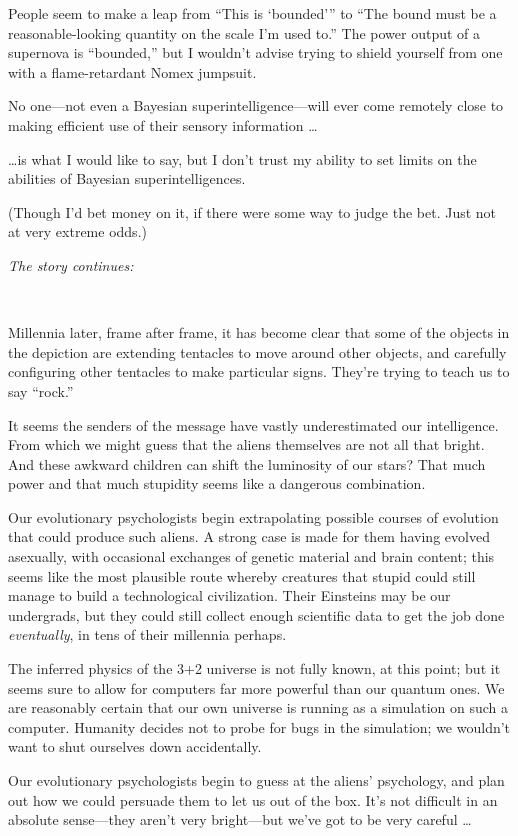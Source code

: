 {
 People seem to make a leap from ``This is
`bounded''' to
``The bound must be a reasonable-looking quantity on
the scale I'm used to.'' The power
output of a supernova is
``bounded,'' but I
wouldn't advise trying to shield yourself from one with
a flame-retardant Nomex jumpsuit.}

{
 No one---not even a Bayesian superintelligence---will ever come
remotely close to making efficient use of their sensory information
\ldots}

{
 \ldots is what I would like to say, but I don't
trust my ability to set limits on the abilities of Bayesian
superintelligences.}

{
 (Though I'd bet money on it, if there were some
way to judge the bet. Just not at very extreme odds.)}

{
 \textit{The story continues:}}

{
 ~}

{
 Millennia later, frame after frame, it has become clear that some
of the objects in the depiction are extending tentacles to move around
other objects, and carefully configuring other tentacles to make
particular signs. They're trying to teach us to say
``rock.''}

{
 It seems the senders of the message have vastly underestimated our
intelligence. From which we might guess that the aliens themselves are
not all that bright. And these awkward children can shift the
luminosity of our stars? That much power and that much stupidity seems
like a dangerous combination.}

{
 Our evolutionary psychologists begin extrapolating possible
courses of evolution that could produce such aliens. A strong case is
made for them having evolved asexually, with occasional exchanges of
genetic material and brain content; this seems like the most plausible
route whereby creatures that stupid could still manage to build a
technological civilization. Their Einsteins may be our undergrads, but
they could still collect enough scientific data to get the job done
\textit{eventually}, in tens of their millennia perhaps.}

{
 The inferred physics of the 3+2 universe is not fully known, at
this point; but it seems sure to allow for computers far more powerful
than our quantum ones. We are reasonably certain that our own universe
is running as a simulation on such a computer. Humanity decides not to
probe for bugs in the simulation; we wouldn't want to
shut ourselves down accidentally.}

{
 Our evolutionary psychologists begin to guess at the
aliens' psychology, and plan out how we could persuade
them to let us out of the box. It's not difficult in an
absolute sense---they aren't very bright---but
we've got to be very careful \ldots}

